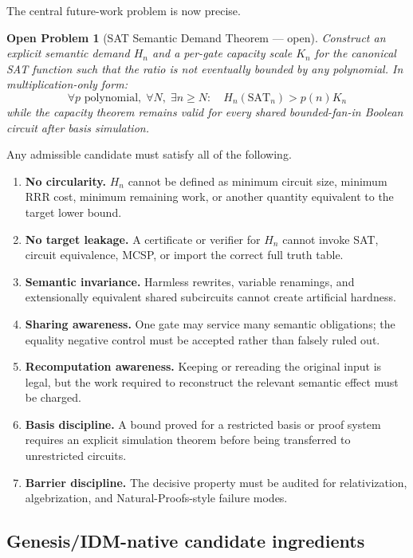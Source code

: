 \documentclass[11pt]{article}
\newtheorem{conjecture}[theorem]{Open Problem}
\newcommand{\SAT}{\mathrm{SAT}}
\begin{document}
The central future-work problem is now precise.

\begin{conjecture}[SAT Semantic Demand Theorem --- open]
Construct an explicit semantic demand $H_n$ and a per-gate capacity scale $K_n$ for the canonical SAT function such that the ratio is not eventually bounded by any polynomial. In multiplication-only form:
\[
\boxed{
\forall p\text{ polynomial},\;\forall N,\;\exists n\ge N:\quad
H_n(\SAT_n)>p(n)K_n
}
\]
while the capacity theorem remains valid for every shared bounded-fan-in Boolean circuit after basis simulation.
\end{conjecture}

Any admissible candidate must satisfy all of the following.
\begin{enumerate}
  \item \textbf{No circularity.} $H_n$ cannot be defined as minimum circuit size, minimum RRR cost, minimum remaining work, or another quantity equivalent to the target lower bound.
  \item \textbf{No target leakage.} A certificate or verifier for $H_n$ cannot invoke SAT, circuit equivalence, MCSP, or import the correct full truth table.
  \item \textbf{Semantic invariance.} Harmless rewrites, variable renamings, and extensionally equivalent shared subcircuits cannot create artificial hardness.
  \item \textbf{Sharing awareness.} One gate may service many semantic obligations; the equality negative control must be accepted rather than falsely ruled out.
  \item \textbf{Recomputation awareness.} Keeping or rereading the original input is legal, but the work required to reconstruct the relevant semantic effect must be charged.
  \item \textbf{Basis discipline.} A bound proved for a restricted basis or proof system requires an explicit simulation theorem before being transferred to unrestricted circuits.
  \item \textbf{Barrier discipline.} The decisive property must be audited for relativization, algebrization, and Natural-Proofs-style failure modes.
\end{enumerate}

\subsection{Genesis/IDM-native candidate ingredients}
\end{document}
